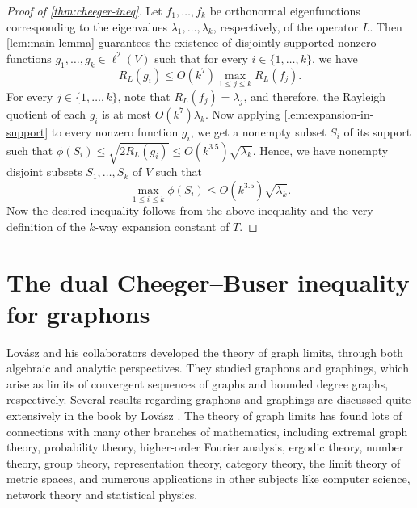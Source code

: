 \documentclass[12pt,a4paper,bold]{thesis}
\theoremstyle{definition}
\begin{document}
\begin{proof}[Proof of \cref{thm:cheeger-ineq}]
    Let $f_1, \dots, f_k$ be orthonormal eigenfunctions corresponding to the eigenvalues
    $\lambda_1, \dots, \lambda_k$, respectively, of the operator $L$. Then 
    \cref{lem:main-lemma} guarantees the existence of disjointly supported 
    nonzero functions $g_1, \dots, g_k \in \ell^2(V)$ such that for every 
    $i \in \{1, \dots, k\}$, we have
    \begin{equation*}
        R_L(g_i) \leq O(k^7) \max_{1 \leq j \leq k} R_L(f_j).
    \end{equation*}
    For every $j \in \{1, \dots, k\}$, note that $R_L(f_j) = \lambda_j$, and therefore,
    the Rayleigh quotient of each $g_i$ is at most $O(k^7) \lambda_k$. Now applying
    \cref{lem:expansion-in-support} to every nonzero function $g_i$, we get 
    a nonempty subset $S_i$ of its support such that $\phi(S_i) \leq \sqrt{2R_L(g_i)}
    \leq O(k^{3.5}) \sqrt{\lambda_k}$. Hence, we have nonempty disjoint subsets
    $S_1, \dots, S_k$ of $V$ such that 
    \begin{equation*}
        \max_{1 \leq i \leq k} \phi(S_i) \leq O(k^{3.5}) \sqrt{\lambda_k}.
    \end{equation*}
    Now the desired inequality follows from the above inequality and 
    the very definition of the $k$-way expansion constant of $T$.
\end{proof}

\chapter{The dual Cheeger--Buser inequality for graphons}

Lov\'asz and his collaborators \cites{Lovasz-Szegedy-limitsofDenseGraphs06,
Lovasz-etal-Counthomo06,Lovasz-etal-cgtseqDenseGraphs08} developed 
the theory of graph limits, through both algebraic and analytic perspectives. 
They studied graphons and graphings, which arise as limits of convergent sequences 
of graphs and bounded degree graphs, respectively. 
Several results regarding graphons and graphings are discussed quite extensively 
in the book by Lov\'asz \cite{Lovasz-LargeNet12}. 
The theory of graph limits has found lots of connections with many other branches 
of mathematics, including extremal graph theory, probability theory, higher-order 
Fourier analysis, ergodic theory, number theory, group theory, representation theory, 
category theory, the limit theory of metric spaces, and numerous applications 
in other subjects like computer science, network theory and statistical physics.
\end{document}
